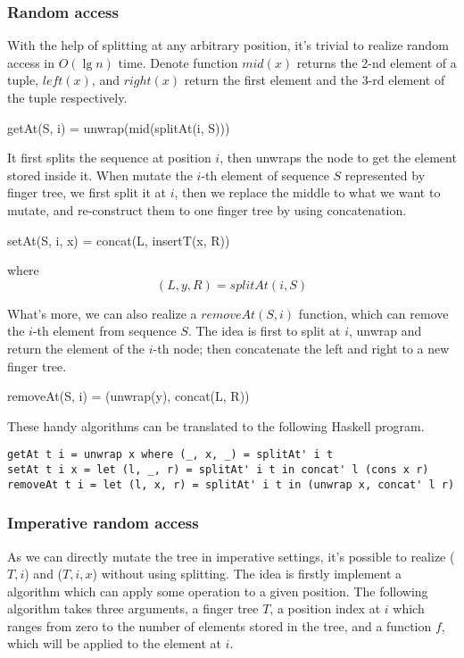 \documentclass[UTF8]{article}
\begin{document}
\subsubsection{Random access}

With the help of splitting at any arbitrary position, it's trivial to realize random
access in $O(\lg n)$ time. Denote function $mid(x)$ returns the 2-nd element of a tuple,
$left(x)$, and $right(x)$ return the first element and the 3-rd element of the tuple
respectively.

\be
getAt(S, i) = unwrap(mid(splitAt(i, S)))
\ee

It first splits the sequence at position $i$, then unwraps the node to get the element
stored inside it. When mutate the $i$-th element of sequence $S$ represented by finger tree,
we first split it at $i$, then we replace the middle to what
we want to mutate, and re-construct them to one finger tree by using concatenation.

\be
setAt(S, i, x) = concat(L, insertT(x, R))
\ee

where
\[
(L, y, R) = splitAt(i, S)
\]

What's more, we can also realize a $removeAt(S, i)$ function, which can remove the
$i$-th element from sequence $S$. The idea is first to split at $i$, unwrap and
return the element of the $i$-th node; then concatenate the left and right to a
new finger tree.

\be
removeAt(S, i) = (unwrap(y), concat(L, R))
\ee

These handy algorithms can be translated to the following Haskell program.

\lstset{language=Haskell}
\begin{lstlisting}
getAt t i = unwrap x where (_, x, _) = splitAt' i t
setAt t i x = let (l, _, r) = splitAt' i t in concat' l (cons x r)
removeAt t i = let (l, x, r) = splitAt' i t in (unwrap x, concat' l r)
\end{lstlisting}

\subsubsection{Imperative random access}
As we can directly mutate the tree in imperative settings, it's possible to
realize ($T, i$) and ($T, i, x$) without
using splitting. The idea is firstly implement a algorithm which can
apply some operation to a given position. The following algorithm takes
three arguments, a finger tree $T$, a position index at $i$ which ranges from
zero to the number of elements stored in the tree, and a function $f$,
which will be applied to the element at $i$.
\end{document}
